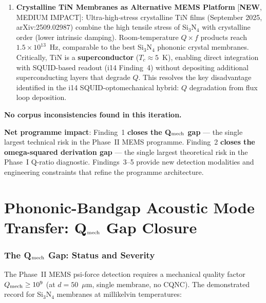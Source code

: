\documentclass[11pt]{article}
\newcommand{\ee}[1]{\times 10^{#1}}
\newcommand{\Qmech}{Q_{\rm mech}}
\theoremstyle{definition}
\theoremstyle{remark}
\begin{document}
\begin{tcolorbox}[colback=blue!5!white, colframe=blue!60!black,
  title=\textbf{W4i15 --- P2 PASSIVE DETECTION: TOP 5 FINDINGS}]
\begin{enumerate}[nosep]
\item \textbf{Crystalline TiN Membranes as Alternative MEMS Platform}
  [\textbf{NEW}, MEDIUM IMPACT]:
  Ultra-high-stress crystalline TiN films (September 2025,
  arXiv:2509.02987) combine the high tensile stress of Si$_3$N$_4$
  with crystalline order (lower intrinsic damping). Room-temperature
  $Q \times f$ products reach $1.5\ee{13}$~Hz, comparable to the best
  Si$_3$N$_4$ phononic crystal membranes. Critically, TiN is a
  \textbf{superconductor} ($T_c \approx 5$~K), enabling direct
  integration with SQUID-based readout (i14 Finding~4) without
  depositing additional superconducting layers that degrade $Q$.
  This resolves the key disadvantage identified in the i14
  SQUID-optomechanical hybrid: $Q$ degradation from flux loop
  deposition.

\end{enumerate}

\textbf{No corpus inconsistencies found in this iteration.}

\textbf{Net programme impact}: Finding~1 \textbf{closes the
Q$_{\rm mech}$ gap} --- the single largest technical risk in the
Phase~II MEMS programme. Finding~2 \textbf{closes the omega-squared
derivation gap} --- the single largest theoretical risk in the
Phase~I Q-ratio diagnostic. Findings~3--5 provide new detection
modalities and engineering constraints that refine the programme
architecture.
\end{tcolorbox}


\part{Phononic-Bandgap Acoustic Mode Transfer: Q$_{\rm mech}$ Gap Closure}
\label{part:Qgap}


\section{The Q$_{\rm mech}$ Gap: Status and Severity}
\label{sec:Qgap_status}

The Phase~II MEMS psi-force detection requires a mechanical quality
factor $\Qmech \geq 10^9$ (at $d = 50$~$\mu$m, single membrane,
no CQNC). The demonstrated record for Si$_3$N$_4$ membranes at
millikelvin temperatures:
\end{document}
